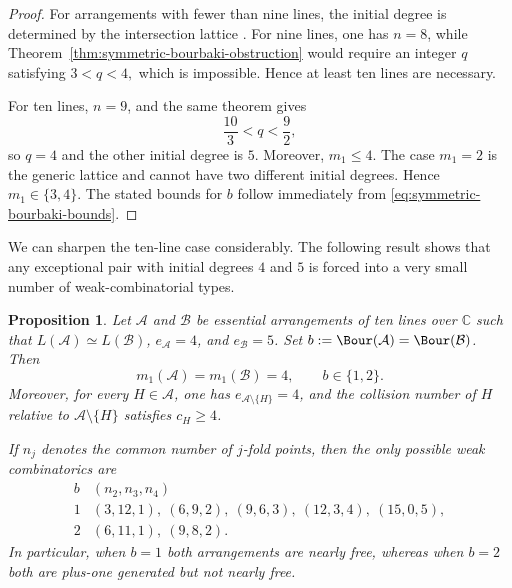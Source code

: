 \documentclass[11pt]{amsart}   %
\newtheorem{Proposition}[Theorem]{Proposition}
\theoremstyle{definition}
\def\NZQ{\mathbb}               %
\def\CC{{\NZQ C}}
\def\A{{\mathcal A}}
\def\B{{\mathcal B}}
\begin{document}
\begin{proof}
For arrangements with fewer than nine lines, the initial degree is determined by the intersection lattice \cite{Dimca-Pokora-Ziegler}. For nine lines, one has $n=8$, while Theorem~\ref{thm:symmetric-bourbaki-obstruction} would require an integer $q$ satisfying $3<q<4,$ which is impossible. Hence at least ten lines are necessary.

For ten lines, $n=9$, and the same theorem gives
\[
\frac{10}{3}<q<\frac92,
\]
so $q=4$ and the other initial degree is $5$. Moreover, $m_1\leq4$. The case $m_1=2$ is the generic lattice and cannot have two different initial degrees. Hence $m_1\in\{3,4\}$. The stated bounds for $b$ follow immediately from \eqref{eq:symmetric-bourbaki-bounds}.
\end{proof}

We can sharpen the ten-line case considerably. The following result shows that any exceptional pair with initial degrees $4$ and $5$ is forced into a very small number of weak-combinatorial types.

\begin{Proposition}
\label{prop:ten-line-symmetric-reduction}
Let $\A$ and $\B$ be essential arrangements of ten lines over $\CC$ such that $L(\A)\simeq L(\B)$, $e_\A=4$, and $e_\B=5$. Set $b:=\Bour(\A)=\Bour(\B)$. Then
\[
m_1(\A)=m_1(\B)=4,
\qquad b\in\{1,2\}.
\]
Moreover, for every $H\in\A$, one has $e_{\A\setminus\{H\}}=4$, and the collision number of $H$ relative to $\A\setminus\{H\}$ satisfies $c_H\geq4$.

If $n_j$ denotes the common number of $j$-fold points, then the only possible weak combinatorics are
\[
\begin{array}{c|c}
b & (n_2,n_3,n_4)\\ \hline 1 & (3,12,1),\ (6,9,2),\ (9,6,3),\ (12,3,4),\ (15,0,5),\\[1mm] 2 & (6,11,1),\ (9,8,2).
\end{array}
\]
In particular, when $b=1$ both arrangements are nearly free, whereas when $b=2$ both are plus-one generated but not nearly free.
\end{Proposition}
\end{document}
